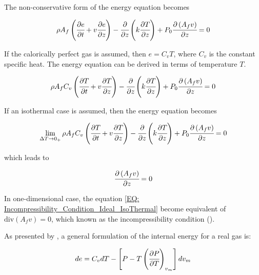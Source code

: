 \documentclass[../Article_Model_Parameters.tex]{subfiles}
\begin{document}
	The non-conservative form of the energy equation becomes
	
	{\footnotesize
		\begin{equation*}
			\rho A_f \left( \cfrac{\partial e }{\partial t} + v \cfrac{\partial e}{\partial z} \right) - \cfrac{\partial}{\partial z} \left( k \cfrac{\partial T}{\partial z} \right) + P_0 \cfrac{\partial \left(A_f v\right)}{\partial z} = 0
		\end{equation*}
	}
	
	If the calorically perfect gas is assumed, then $e=C_vT$, where $C_v$ is the constant specific heat. The energy equation can be derived in terms of temperature $T$.
	
	{\footnotesize
		\begin{equation*}
			\rho A_f C_v \left( \cfrac{\partial T }{\partial t} + v \cfrac{\partial T}{\partial z} \right) - \cfrac{\partial}{\partial z} \left( k \cfrac{\partial T}{\partial z} \right) + P_0 \cfrac{\partial \left(A_f v\right)}{\partial z} = 0
		\end{equation*}
	}
	
	If an isothermal case is assumed, then the energy equation becomes
	
	{\footnotesize
		\begin{equation*}
			\lim_{\Delta T \rightarrow 0_+} \rho A_f C_v \left( \cfrac{\partial T }{\partial t} + v \cfrac{\partial T}{\partial z} \right) - \cfrac{\partial}{\partial z} \left( k \cfrac{\partial T}{\partial z} \right) + P_0 \cfrac{\partial \left(A_f v\right)}{\partial z} = 0
		\end{equation*}
	}
	
	which leads to
	
	{\footnotesize
		\begin{equation}
			\cfrac{\partial \left(A_f v\right)}{\partial z} = 0
			\label{EQ: Incompressibility_Condition_Ideal_IsoThermal}
		\end{equation}
	}
	
	In one-dimensional case, the equation \ref{EQ: Incompressibility_Condition_Ideal_IsoThermal} become equivalent of $\text{div} ( A_f v) = 0$, which known as the incompressibility condition (\citet{Lions2013}). 
	
	As presented by \citet{Elliott2011}, a general formulation of the internal energy for a real gas is:
	
	{\footnotesize
		\begin{equation*}
			de=C_vdT-\left[P-T\left(\cfrac{\partial P}{\partial T}\right)_{v_m}\right]dv_m
	\end{equation*} }
	
\end{document}
